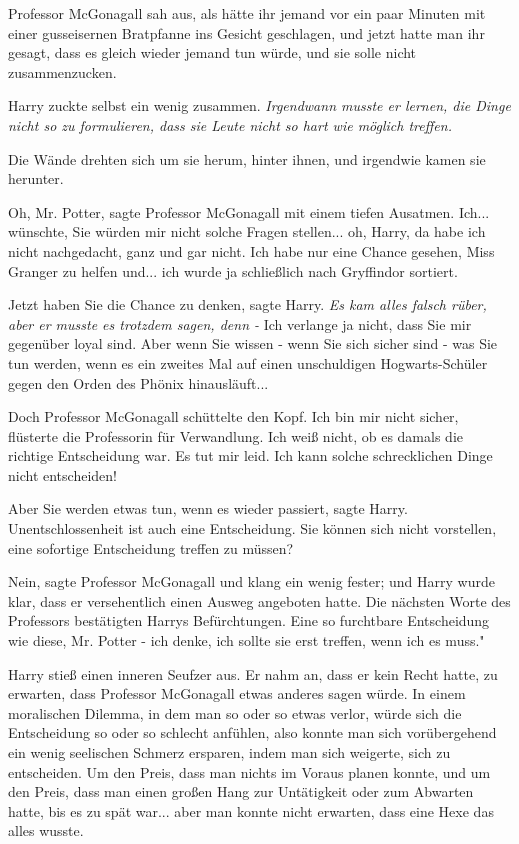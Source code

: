 Professor McGonagall sah aus, als hätte ihr jemand vor ein paar Minuten mit
einer gusseisernen Bratpfanne ins Gesicht geschlagen, und jetzt hatte man ihr
gesagt, dass es gleich wieder jemand tun würde, und sie solle nicht
zusammenzucken.

Harry zuckte selbst ein wenig zusammen. \emph{Irgendwann musste er lernen, die
Dinge nicht so zu formulieren, dass sie Leute nicht so hart wie möglich
treffen.}

Die Wände drehten sich um sie herum, hinter ihnen, und irgendwie kamen sie
herunter.

\glqq{}Oh, Mr. Potter\grqq{}, sagte Professor McGonagall mit einem tiefen
Ausatmen. \glqq{}Ich... wünschte, Sie würden mir nicht solche Fragen stellen...
oh, Harry, da habe ich nicht nachgedacht, ganz und gar nicht. Ich habe nur eine
Chance gesehen, Miss Granger zu helfen und... ich wurde ja schließlich nach
Gryffindor sortiert.\grqq{}

\glqq{}Jetzt haben Sie die Chance zu denken\grqq{}, sagte Harry. \emph{Es kam
alles falsch rüber, aber er musste es trotzdem sagen, denn -} \glqq{}Ich verlange
ja nicht, dass Sie mir gegenüber loyal sind. Aber wenn Sie wissen - wenn Sie
sich sicher sind - was Sie tun werden, wenn es ein zweites Mal auf einen
unschuldigen Hogwarts-Schüler gegen den Orden des Phönix hinausläuft...\grqq{}

Doch Professor McGonagall schüttelte den Kopf. \glqq{}Ich bin mir nicht
sicher\grqq{}, flüsterte die Professorin für Verwandlung. \glqq{}Ich weiß nicht,
ob es damals die richtige Entscheidung war. Es tut mir leid. Ich kann solche
schrecklichen Dinge nicht entscheiden!\grqq{}

\glqq{}Aber Sie werden etwas tun, wenn es wieder passiert\grqq{}, sagte Harry.
\glqq{}Unentschlossenheit ist auch eine Entscheidung. Sie können sich nicht
vorstellen, eine sofortige Entscheidung treffen zu müssen?\grqq{}

\glqq{}Nein\grqq{}, sagte Professor McGonagall und klang ein wenig fester; und
Harry wurde klar, dass er versehentlich einen Ausweg angeboten hatte. Die
nächsten Worte des Professors bestätigten Harrys Befürchtungen. \glqq{}Eine so
furchtbare Entscheidung wie diese, Mr. Potter - ich denke, ich sollte sie erst
treffen, wenn ich es muss."

Harry stieß einen inneren Seufzer aus. Er nahm an, dass er kein Recht hatte, zu
erwarten, dass Professor McGonagall etwas anderes sagen würde. In einem
moralischen Dilemma, in dem man so oder so etwas verlor, würde sich die
Entscheidung so oder so schlecht anfühlen, also konnte man sich vorübergehend
ein wenig seelischen Schmerz ersparen, indem man sich weigerte, sich zu
entscheiden. Um den Preis, dass man nichts im Voraus planen konnte, und um den
Preis, dass man einen großen Hang zur Untätigkeit oder zum Abwarten hatte, bis
es zu spät war... aber man konnte nicht erwarten, dass eine Hexe das alles
wusste.


